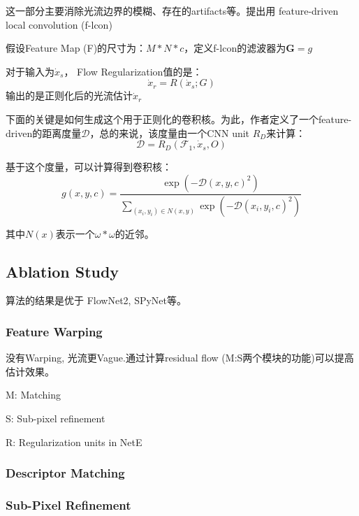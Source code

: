 这一部分主要消除光流边界的模糊、存在的artifacts等。提出用 feature-driven local convolution (f-lcon)

假设Feature Map (F)的尺寸为：$M * N * c$，定义f-lcon的滤波器为$\textbf{G}={g}$

对于输入为$\dot{x}_s$， Flow Regularization值的是：
\begin{displaymath}
\dot{x}_r = R(\dot{x}_s; G)
\end{displaymath}
输出的是正则化后的光流估计$\dot{x}_r$

下面的关键是如何生成这个用于正则化的卷积核。为此，作者定义了一个feature-driven的距离度量$\mathcal{D}$，总的来说，该度量由一个CNN unit $R_D$来计算：
\begin{displaymath}
\mathcal{D} = R_D(\mathcal{F}_1, \dot{x}_s, O)
\end{displaymath}

基于这个度量，可以计算得到卷积核：
\begin{displaymath}
g(x, y, c) = \frac{\exp(-\mathcal{D}(x, y, c)^2)}{\sum_{(x_i, y_i)\in N(x, y)}\exp(-\mathcal{D}(x_i, y_i, c)^2)}
\end{displaymath}

其中$N(x)$表示一个$\omega * \omega$的近邻。

\subsection{Ablation Study}

算法的结果是优于 FlowNet2, SPyNet等。

\subsubsection{Feature Warping}

没有Warping, 光流更Vague.通过计算residual flow (M:S两个模块的功能)可以提高估计效果。

M: Matching

S: Sub-pixel refinement

R: Regularization units in NetE

\subsubsection{Descriptor Matching}

\subsubsection{Sub-Pixel Refinement}

